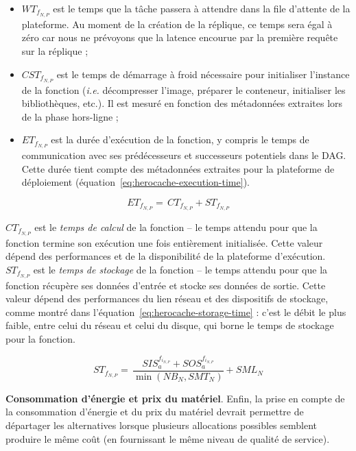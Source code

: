 {\begin{itemize}
    \item ${WT}_{{f}_{N, P}}$ est le temps que la tâche passera à attendre dans la file d'attente de la plateforme. Au moment de la création de la réplique, ce temps sera égal à zéro car nous ne prévoyons que la latence encourue par la première requête sur la réplique ;
    \item ${CST}_{{f}_{N, P}}$ est le temps de démarrage à froid nécessaire pour initialiser l'instance de la fonction (\textit{i.e.} décompresser l'image, préparer le conteneur, initialiser les bibliothèques, etc.). Il est mesuré en fonction des métadonnées extraites lors de la phase hors-ligne ;
    \item ${ET}_{{f}_{N, P}}$ est la durée d'exécution de la fonction, y compris le temps de communication avec ses prédécesseurs et successeurs potentiels dans le DAG. Cette durée tient compte des métadonnées extraites pour la plateforme de déploiement (équation~\ref{eq:herocache-execution-time}).
\end{itemize}

\begin{equation}
    {ET}_{{f}_{N, P}} = \, {CT}_{{f}_{N, P}} + {ST}_{{f}_{N, P}}
\label{eq:herocache-execution-time}
\end{equation}

${CT}_{{f}_{N, P}}$ est le \textit{temps de calcul} de la fonction -- le temps attendu pour que la fonction termine son exécution une fois entièrement initialisée. Cette valeur dépend des performances et de la disponibilité de la plateforme d'exécution. ${ST}_{{f}_{N, P}}$ est le \textit{temps de stockage} de la fonction -- le temps attendu pour que la fonction récupère ses données d'entrée et stocke ses données de sortie. Cette valeur dépend des performances du lien réseau et des dispositifs de stockage, comme montré dans l'équation~\ref{eq:herocache-storage-time} : c'est le débit le plus faible, entre celui du réseau et celui du disque, qui borne le temps de stockage pour la fonction.

\begin{equation}
    {ST}_{{f}_{N, P}} = \, \frac{SIS_{a}^{f_{i_{N, P}}} + SOS_{a}^{f_{i_{N, P}}}}{\min (NB_{N}, SMT_{N})} + SML_{N}
\label{eq:herocache-storage-time}
\end{equation}

\textbf{Consommation d'énergie et prix du matériel}. Enfin, la prise en compte de la consommation d'énergie et du prix du matériel devrait permettre de départager les alternatives lorsque plusieurs allocations possibles semblent produire le même coût (en fournissant le même niveau de qualité de service).

}
